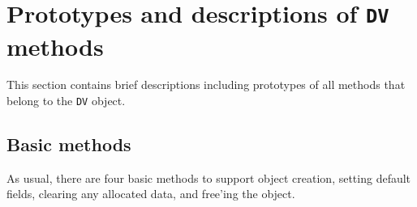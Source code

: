\par
\section{Prototypes and descriptions of {\tt DV} methods}
\label{section:DV:proto}
\par
This section contains brief descriptions including prototypes
of all methods that belong to the {\tt DV} object.
\par
\subsection{Basic methods}
\label{subsection:DV:proto:basics}
\par
As usual, there are four basic methods to support object creation,
setting default fields, clearing any allocated data, and free'ing
the object.
\par
